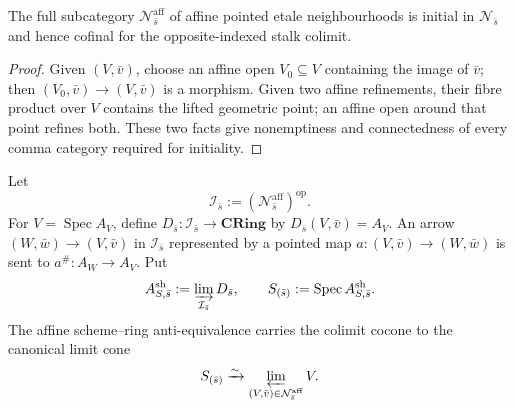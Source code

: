 \begin{lemma}
\label{lemma:weil-pbc-affine-neighbourhood-cofinal}
The full subcategory $\mathcal N^{\mathrm{aff}}_{\bar s}$ of affine pointed
etale neighbourhoods is initial in $\mathcal N_{\bar s}$ and hence cofinal
for the opposite-indexed stalk colimit.
\end{lemma}
\begin{proof}
\uses{} 
Given $(V,\bar v)$, choose an affine open $V_0\subseteq V$ containing the
image of $\bar v$; then $(V_0,\bar v)\to(V,\bar v)$ is a morphism.  Given two
affine refinements, their fibre product over $V$ contains the lifted geometric
point; an affine open around that point refines both.  These two facts give
nonemptiness and connectedness of every comma category required for
initiality.
\end{proof}

\begin{definition}
\label{def:weil-pbc-strict-henselization-limit}
Let
\[
 \mathcal I_{\bar s}:=
 (\mathcal N^{\mathrm{aff}}_{\bar s})^{\mathrm{op}}.
\]
For $V=\operatorname{Spec}A_V$, define
$D_{\bar s}:\mathcal I_{\bar s}\to\mathbf{CRing}$ by
$D_{\bar s}(V,\bar v)=A_V$.  An arrow
$(W,\bar w)\to(V,\bar v)$ in $\mathcal I_{\bar s}$ represented by a pointed
map $a:(V,\bar v)\to(W,\bar w)$ is sent to
$a^\#:A_W\to A_V$.  Put
\[
 A^{\mathrm{sh}}_{S,\bar s}:=\varinjlim_{\mathcal I_{\bar s}}D_{\bar s},
 \qquad
 S_{(\bar s)}:=\operatorname{Spec}A^{\mathrm{sh}}_{S,\bar s}.
\]
The affine scheme--ring anti-equivalence carries the colimit cocone to the
canonical limit cone
\[
 S_{(\bar s)}\xrightarrow{\sim}
 \varprojlim_{(V,\bar v)\in\mathcal N^{\mathrm{aff}}_{\bar s}}V.
\]
\end{definition}


